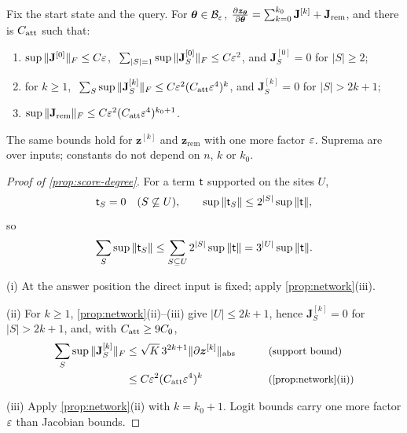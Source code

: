 \begin{proposition}
\label{prop:score-degree}
Fix the start state and the query. For $\bm\theta\in\mathcal B_{\varepsilon}$, $\Jz=\sum_{k=0}^{k_0}\mathbf J^{[k]}+\mathbf J_{\mathrm{rem}}$, and there is $C_{\mathrm{att}}$ such that:
\begin{enumerate}[label=(\roman*),leftmargin=*,itemsep=2pt,topsep=2pt]
\item $\sup\|\mathbf J^{[0]}\|_F\le C\varepsilon$, $\ \sum_{|S|=1}\sup\|\mathbf J^{[0]}_S\|_F\le C\initscale^2$, and $\mathbf J^{[0]}_S=0$ for $|S|\ge2$;
\item for $k\ge1$, $\ \sum_S\sup\|\mathbf J^{[k]}_S\|_F\le C\varepsilon^2(C_{\mathrm{att}}\varepsilon^4)^k$, and $\mathbf J^{[k]}_S=0$ for $|S|>2k+1$;
\item $\sup\|\mathbf J_{\mathrm{rem}}\|_F\le C\varepsilon^2(C_{\mathrm{att}}\varepsilon^4)^{k_0+1}$.
\end{enumerate}
The same bounds hold for $\bm z^{[k]}$ and $\bm z_{\mathrm{rem}}$ with one more factor $\varepsilon$. Suprema are over inputs; constants do not depend on
$n$, $k$ or $k_0$.
\end{proposition}

\begin{proof}[Proof of \cref{prop:score-degree}]
For a term $\mathsf t$ supported on the sites $U$,
\[
 \mathsf t_S=0\quad(S\not\subseteq U),\qquad \sup\|\mathsf t_S\|\le2^{|S|}\sup\|\mathsf t\|,
\]
so
\[
 \sum_S\sup\|\mathsf t_S\|\le\sum_{S\subseteq U}2^{|S|}\sup\|\mathsf t\|=3^{|U|}\sup\|\mathsf t\| .
\]

\noindent(i) At the answer position the direct input is fixed; apply \cref{prop:network}(iii).

\smallskip\noindent(ii) For $k\ge1$, \cref{prop:network}(ii)--(iii) give $|U|\le2k+1$, hence $\mathbf J^{[k]}_S=0$ for $|S|>2k+1$, and, with $C_{\mathrm{att}}\ge9C_0$,
\begin{alignat*}{2}
 \sum_S\sup\|\mathbf J^{[k]}_S\|_F&\le\sqrt K\,3^{2k+1}\|\partial\bm z^{[k]}\|_{\mathrm{abs}} &\qquad& \why{support bound}\\
 &\le C\initscale^2(\attconst\initscale^4)^k && \why{\cref{prop:network}(ii)}
\end{alignat*}

\noindent(iii) Apply \cref{prop:network}(ii) with $k=k_0+1$. Logit bounds carry one more factor $\varepsilon$ than Jacobian bounds.
\end{proof}


